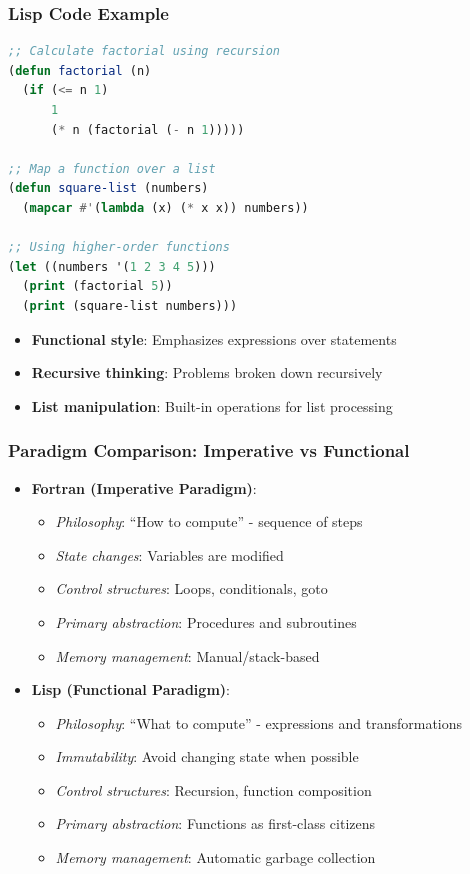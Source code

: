 \documentclass{beamer}
\begin{document}
\begin{frame}[fragile,t]
\frametitle{Lisp Code Example}
\scriptsize
\begin{lstlisting}[language=Lisp, caption=Common Lisp Style]
;; Calculate factorial using recursion
(defun factorial (n)
  (if (<= n 1)
      1
      (* n (factorial (- n 1)))))

;; Map a function over a list
(defun square-list (numbers)
  (mapcar #'(lambda (x) (* x x)) numbers))

;; Using higher-order functions
(let ((numbers '(1 2 3 4 5)))
  (print (factorial 5))
  (print (square-list numbers)))
\end{lstlisting}

\begin{itemize}
    \item \textbf{Functional style}: Emphasizes expressions over statements
    \item \textbf{Recursive thinking}: Problems broken down recursively
    \item \textbf{List manipulation}: Built-in operations for list processing
\end{itemize}
\end{frame}

\begin{frame}[t]
\frametitle{Paradigm Comparison: Imperative vs Functional}
\begin{itemize}
    \item \textbf{Fortran (Imperative Paradigm)}:
    \begin{itemize}
        \item \textit{Philosophy}: ``How to compute'' - sequence of steps
        \item \textit{State changes}: Variables are modified
        \item \textit{Control structures}: Loops, conditionals, goto
        \item \textit{Primary abstraction}: Procedures and subroutines
        \item \textit{Memory management}: Manual/stack-based
    \end{itemize}
    
    \item \textbf{Lisp (Functional Paradigm)}:
    \begin{itemize}
        \item \textit{Philosophy}: ``What to compute'' - expressions and transformations
        \item \textit{Immutability}: Avoid changing state when possible
        \item \textit{Control structures}: Recursion, function composition
        \item \textit{Primary abstraction}: Functions as first-class citizens
        \item \textit{Memory management}: Automatic garbage collection
    \end{itemize}
\end{itemize}
\end{frame}
\end{document}
